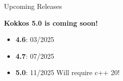\begin{frame}[fragile]{Upcoming Releases}
  \begin{center}
\textbf{Kokkos 5.0 is coming soon!}
\vspace{1cm}
  \begin{itemize}
    \item{\textbf{4.6}: 03/2025}
    \item{\textbf{4.7}: \textcolor{black!40!white}{07/2025}}
    \item{\textbf{5.0}: \textcolor{black!40!white}{11/2025} Will require c++ 20!}
  \end{itemize}
  \end{center}
\end{frame}
